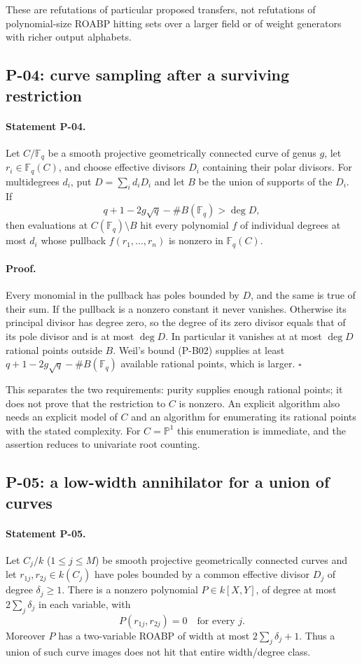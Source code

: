 \documentclass[11pt,a4paper]{article}
\theoremstyle{definition}\newtheorem{definition}{Definition}
\begin{document}
These are refutations of particular proposed transfers, not refutations of polynomial-size ROABP hitting sets over a larger field or of weight generators with richer output alphabets.

\subsection{P-04: curve sampling after a surviving restriction}
\paragraph{Statement P-04.}
Let $C/\mathbb F_q$ be a smooth projective geometrically connected curve of genus $g$, let $r_i\in\mathbb F_q(C)$, and choose effective divisors $D_i$ containing their polar divisors. For multidegrees $d_i$, put $D=\sum_i d_iD_i$ and let $B$ be the union of supports of the $D_i$. If
\[
 q+1-2g\sqrt q-\#B(\mathbb F_q)>\deg D,
\]
then evaluations at $C(\mathbb F_q)\setminus B$ hit every polynomial $f$ of individual degrees at most $d_i$ whose pullback $f(r_1,\ldots,r_n)$ is nonzero in $\mathbb F_q(C)$.
\paragraph{Proof.}
Every monomial in the pullback has poles bounded by $D$, and the same is true of their sum. If the pullback is a nonzero constant it never vanishes. Otherwise its principal divisor has degree zero, so the degree of its zero divisor equals that of its pole divisor and is at most $\deg D$. In particular it vanishes at at most $\deg D$ rational points outside $B$. Weil's bound (P-B02) supplies at least $q+1-2g\sqrt q-\#B(\mathbb F_q)$ available rational points, which is larger. $\square$

This separates the two requirements: purity supplies enough rational points; it does not prove that the restriction to $C$ is nonzero. An explicit algorithm also needs an explicit model of $C$ and an algorithm for enumerating its rational points with the stated complexity. For $C=\mathbb P^1$ this enumeration is immediate, and the assertion reduces to univariate root counting.

\subsection{P-05: a low-width annihilator for a union of curves}
\paragraph{Statement P-05.}
Let $C_j/k$ ($1\le j\le M$) be smooth projective geometrically connected curves and let $r_{1j},r_{2j}\in k(C_j)$ have poles bounded by a common effective divisor $D_j$ of degree $\delta_j\ge1$. There is a nonzero polynomial $P\in k[X,Y]$, of degree at most $2\sum_j\delta_j$ in each variable, with
\[
 P(r_{1j},r_{2j})=0\quad\text{for every }j.
\]
Moreover $P$ has a two-variable ROABP of width at most $2\sum_j\delta_j+1$. Thus a union of such curve images does not hit that entire width/degree class.
\end{document}
